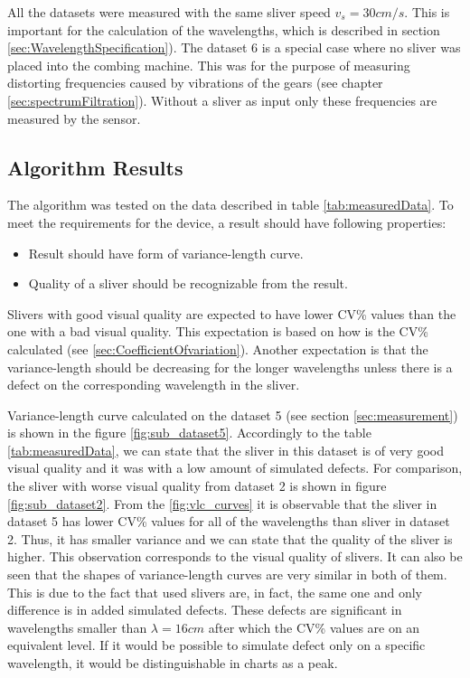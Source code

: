 \documentclass[twoside]{ctuthesis}
\theoremstyle{plain}
\theoremstyle{definition}
\theoremstyle{note}
\begin{document}
All the datasets were measured with the same sliver speed $v_s=30cm/s$. This is important for the calculation of the wavelengths, which is described in section \ref{sec:WavelengthSpecification}).
The dataset 6 is a special case where no sliver was placed into the combing machine. This was for the purpose of measuring distorting frequencies caused by vibrations of the gears (see chapter \ref{sec:spectrumFiltration}). Without a sliver as input only these frequencies are measured by the sensor.

\subsection{Algorithm Results}
The algorithm was tested on the data described in table \ref{tab:measuredData}. To meet the requirements for the device, a result should have following properties:
\begin{itemize}
	\setlength{\itemsep}{5pt}
	\item Result should have form of variance-length curve.
	\item Quality of a sliver should be recognizable from the result.
\end{itemize}

Slivers with good visual quality are expected to have lower CV\% values than the one with a bad visual quality. This expectation is based on how is the CV\% calculated (see \ref{sec:CoefficientOfvariation}). Another expectation is that the variance-length should be decreasing for the longer wavelengths unless there is a defect on the corresponding wavelength in the sliver.

Variance-length curve calculated on the dataset 5 (see section \ref{sec:measurement}) is shown in the figure \ref{fig:sub_dataset5}. Accordingly to the table \ref{tab:measuredData}, we can state that the sliver in this dataset is of very good visual quality and it was with a low amount of simulated defects. For comparison, the sliver with worse visual quality from dataset 2 is shown in figure \ref{fig:sub_dataset2}. From the \ref{fig:vlc_curves} it is observable that the sliver in dataset 5 has lower CV\% values for all of the wavelengths than sliver in dataset 2. Thus, it has smaller variance and we can state that the quality of the sliver is higher. This observation corresponds to the visual quality of slivers.
It can also be seen that the shapes of variance-length curves are very similar in both of them. This is due to the fact that used slivers are, in fact, the same one and only difference is in added simulated defects. These defects are significant in wavelengths smaller than $\lambda=16cm$ after which the CV\% values are on an equivalent level. If it would be possible to simulate defect only on a specific wavelength, it would be distinguishable in charts as a peak. 
\end{document}
